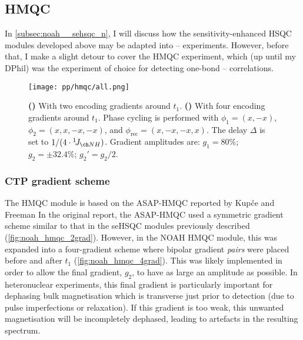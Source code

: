 \subsection{\texorpdfstring{\nitrogen{}}{15N} HMQC}
\label{subsec:noah__hmqc}

In \cref{subsec:noah__sehsqc_n}, I will discuss how the sensitivity-enhanced HSQC modules developed above may be adapted into \proton{}--\nitrogen{} experiments.
However, before that, I make a slight detour to cover the \nitrogen{} HMQC experiment, which (up until my DPhil) was the experiment of choice for detecting one-bond \proton{}--\nitrogen{} correlations.

\begin{figure}[htb]
    \centering
    \texttt{[image: pp/hmqc/all.png]}%
    {\label{fig:noah_hmqc_2grad}}%
    {\label{fig:noah_hmqc_4grad}}%
    \caption[NOAH HMQC pulse sequences]{
        \textbf{()} With two encoding gradients around $t_1$.
        \textbf{()} With four encoding gradients around $t_1$.
        Phase cycling is performed with $\phi_1 = (x, -x)$, $\phi_2 = (x, x, -x, -x)$, and $\phi_\text{rec} = (x, -x, -x, x)$.
        The delay $\Delta$ is set to $1 / (4 \cdot \oneJ{NH})$.
        Gradient amplitudes are: $g_1 = 80\%$; $g_2 = \pm 32.4\%$; $g_2' = g_2/2$.
    }
    \label{fig:noah_hmqc}
\end{figure}


\subsubsection{CTP gradient scheme}

The HMQC module is based on the ASAP-HMQC reported by Kup{\v{c}}e and Freeman\autocite{Kupce2007MRC}
In the original report, the ASAP-HMQC used a symmetric gradient scheme similar to that in the seHSQC modules previously described (\cref{fig:noah_hmqc_2grad}).
However, in the NOAH HMQC module\autocite{Kupce2017ACIE}, this was expanded into a four-gradient scheme where bipolar gradient \textit{pairs} were placed before and after $t_1$ (\cref{fig:noah_hmqc_4grad}).
This was likely implemented in order to allow the final gradient, $g_2$, to have as large an amplitude as possible.
In heteronuclear experiments, this final gradient is particularly important for dephasing bulk magnetisation which is transverse just prior to detection (due to pulse imperfections or relaxation).
If this gradient is too weak, this unwanted magnetisation will be incompletely dephased, leading to artefacts in the resulting spectrum.

